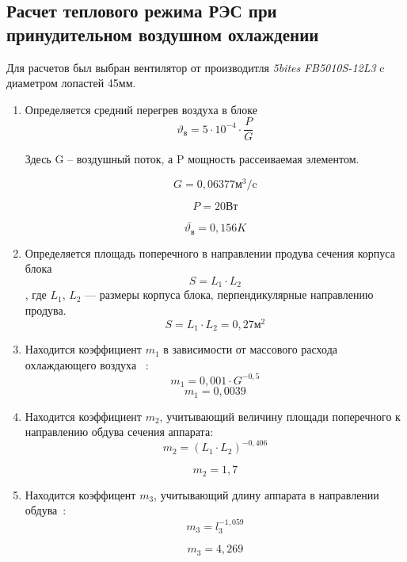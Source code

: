 \subsection{Расчет теплового режима РЭС при принудительном воздушном охлаждении}

Для расчетов был выбран вентилятор от производитля \textit{5bites}
\textit{FB5010S-12L3} c диаметром лопастей 45мм.

\begin{enumerate}[label={\arabic*.}]
\item Определяется средний перегрев воздуха в блоке
\begin{equation}
\vartheta\mathrm{_в} = 5 \cdot 10^{-4} \cdot \frac{P}{G}
\end{equation}

Здесь G – воздушный поток, а P мощность рассеиваемая элементом.

$$G = 0,06377\mathrm{м^3/c}$$

$$P = 20\mathrm{Вт}$$

$$\overline{\vartheta\mathrm{_в}} = 0,156K$$  
\item Определяется площадь поперечного
  в направлении продува сечения корпуса блока $$S= L_1 \cdot L_2$$,
  где $L_1$, $L_2$ — размеры корпуса блока,
  перпендикулярные направлению продува.
  $$S= L_1 \cdot L_2 =0,27\mathrm{м^2}$$

\item Находится коэффициент $m_1$ в зависимости
  от массового расхода охлаждающего воздуха ~\cite{Rotkop1976}:
  \begin{equation}
    m_1 = 0,001 \cdot G^{-0,5}
    \end{equation}
  $$m_1 = 0,0039$$

\item Находится коэффициент $m_2$,
  учитывающий величину площади поперечного
  к направлению обдува сечения аппарата\cite{Rotkop1976}:
  \begin{equation}
    m_2= (L_1 \cdot L_2) ^ {-0,406}
    \end{equation}

    $$m_2 = 1,7$$

  \item Находится коэффицент $m_3$,
    учитывающий длину аппарата в направлении обдува~\cite{Rotkop1976}:
    \begin{equation}
      m_3 = l_3 ^ {-1,059}
      \end{equation}

      $$m_3 = 4,269$$


\end{enumerate}
